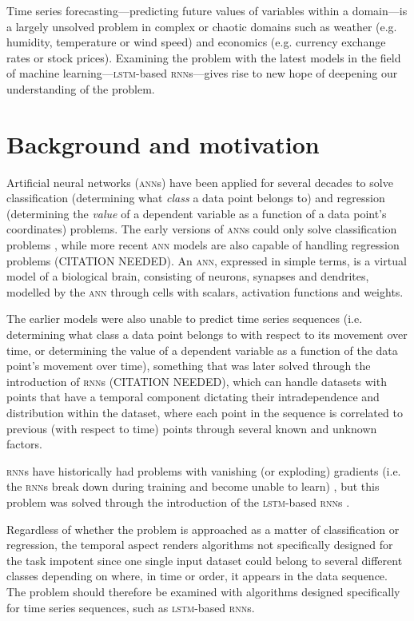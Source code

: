 Time series forecasting---predicting future values of variables within a
domain---is a largely unsolved problem in complex or chaotic domains such as
weather (e.g. humidity, temperature or wind speed) and economics (e.g. currency
exchange rates or stock prices).  Examining the problem with the latest models
in the field of machine learning---\textsc{lstm}-based \textsc{rnn}s---gives
rise to new hope of deepening our understanding of the problem.

\section{Background and motivation}
Artificial neural networks (\textsc{ann}s) have been applied for several decades
to solve classification (determining what \textit{class} a data point belongs
to) and regression (determining the \textit{value} of a dependent variable as a
function of a data point's coordinates) problems.  The early versions of
\textsc{ann}s could only solve classification problems \citep{rosenblatt1958},
while more recent \textsc{ann} models are also capable of handling regression
problems (CITATION NEEDED).  An \textsc{ann}, expressed in simple terms, is a
virtual model of a biological brain, consisting of neurons, synapses and
dendrites, modelled by the \textsc{ann} through cells with scalars, activation
functions and weights.

The earlier models were also unable to predict time series sequences (i.e.
determining what class a data point belongs to with respect to its movement over
time, or determining the value of a dependent variable as a function of the data
point's movement over time), something that was later solved through the
introduction of \textsc{rnn}s (CITATION NEEDED), which can handle datasets with
points that have a temporal component dictating their intradependence and
distribution within the dataset, where each point in the sequence is correlated
to previous (with respect to time) points through several known and unknown
factors.

\textsc{rnn}s have historically had problems with vanishing (or exploding)
gradients (i.e. the \textsc{rnn}s break down during training and become unable
to learn) \citep{pascanu2012}, but this problem was solved through the
introduction of the \textsc{lstm}-based \textsc{rnn}s \citep*{hochreiter1997}.

Regardless of whether the problem is approached as a matter of classification or
regression, the temporal aspect renders algorithms not specifically designed for
the task impotent since one single input dataset could belong to several
different classes depending on where, in time or order, it appears in the data
sequence.  The problem should therefore be examined with algorithms designed
specifically for time series sequences, such as \textsc{lstm}-based
\textsc{rnn}s.

